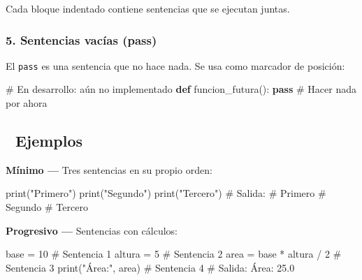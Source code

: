 \documentclass[
  doc,
  floatsintext,
  longtable,
  a4paper,
  nolmodern,
  notxfonts,
  notimes,
  12pt,
  colorlinks=true,linkcolor=blue,citecolor=blue,urlcolor=blue]{apa7}
\newenvironment{Shaded}{\begin{snugshade}}{\end{snugshade}}
\newcommand{\BuiltInTok}[1]{\textcolor[rgb]{0.00,0.23,0.31}{#1}}
\newcommand{\CommentTok}[1]{\textcolor[rgb]{0.37,0.37,0.37}{#1}}
\newcommand{\ControlFlowTok}[1]{\textcolor[rgb]{0.00,0.23,0.31}{\textbf{#1}}}
\newcommand{\DecValTok}[1]{\textcolor[rgb]{0.68,0.00,0.00}{#1}}
\newcommand{\KeywordTok}[1]{\textcolor[rgb]{0.00,0.23,0.31}{\textbf{#1}}}
\newcommand{\NormalTok}[1]{\textcolor[rgb]{0.00,0.23,0.31}{#1}}
\newcommand{\OperatorTok}[1]{\textcolor[rgb]{0.37,0.37,0.37}{#1}}
\newcommand{\StringTok}[1]{\textcolor[rgb]{0.13,0.47,0.30}{#1}}
\begin{document}
Cada bloque indentado contiene sentencias que se ejecutan juntas.

\subsubsection{5. Sentencias vacías
(pass)}\label{sentencias-vacuxedas-pass}

El \texttt{pass} es una sentencia que no hace nada. Se usa como marcador
de posición:

\begin{Shaded}
\begin{Highlighting}[]
\CommentTok{\# En desarrollo: aún no implementado}
\KeywordTok{def}\NormalTok{ funcion\_futura():}
    \ControlFlowTok{pass}  \CommentTok{\# Hacer nada por ahora}
\end{Highlighting}
\end{Shaded}

\subsection{🔬 Ejemplos}\label{ejemplos}

\textbf{Mínimo ---} Tres sentencias en su propio orden:

\begin{Shaded}
\begin{Highlighting}[]
\BuiltInTok{print}\NormalTok{(}\StringTok{"Primero"}\NormalTok{)}
\BuiltInTok{print}\NormalTok{(}\StringTok{"Segundo"}\NormalTok{)}
\BuiltInTok{print}\NormalTok{(}\StringTok{"Tercero"}\NormalTok{)}
\CommentTok{\# Salida:}
\CommentTok{\# Primero}
\CommentTok{\# Segundo}
\CommentTok{\# Tercero}
\end{Highlighting}
\end{Shaded}

\textbf{Progresivo ---} Sentencias con cálculos:

\begin{Shaded}
\begin{Highlighting}[]
\NormalTok{base }\OperatorTok{=} \DecValTok{10}          \CommentTok{\# Sentencia 1}
\NormalTok{altura }\OperatorTok{=} \DecValTok{5}         \CommentTok{\# Sentencia 2}
\NormalTok{area }\OperatorTok{=}\NormalTok{ base }\OperatorTok{*}\NormalTok{ altura }\OperatorTok{/} \DecValTok{2}  \CommentTok{\# Sentencia 3}
\BuiltInTok{print}\NormalTok{(}\StringTok{"Área:"}\NormalTok{, area)      }\CommentTok{\# Sentencia 4}
\CommentTok{\# Salida: Área: 25.0}
\end{Highlighting}
\end{Shaded}
\end{document}
